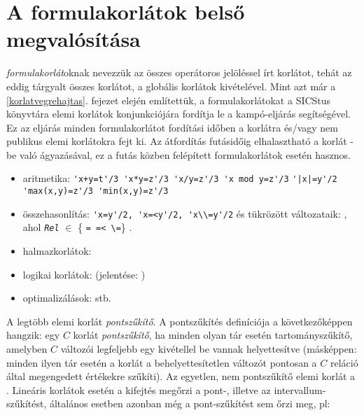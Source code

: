 \section{A formulakorlátok belső megvalósítása}
\label{korlatkif}

 \emph{formulakorlát}oknak nevezzük az összes operátoros
jelöléssel írt korlátot, tehát az eddig tárgyalt összes korlátot, a
globális korlátok kivételével.
\br
Mint azt már a \ref{korlatvegrehajtas}. fejezet elején említettük, a
formulakorlátokat a SICStus \clpfd könyvtára elemi korlátok konjunkciójára
fordítja le a  kampó-eljárás segítségével. Ez az
eljárás minden formulakorlátot fordítási időben a 
korlátra és/vagy nem publikus elemi korlátokra fejt ki. Az átfordítás
futásidőig elhalasztható a korlát -be való ágyazásával, ez
a futás közben felépített formulakorlátok esetén hasznos.

\begin{itemize}
\item aritmetika: \verb?'x+y=t'/3 'x*y=z'/3 'x/y=z'/3 'x mod y=z'/3?
\verb?'|x|=y'/2 'max(x,y)=z'/3 'min(x,y)=z'/3?
 \item összehasonlítás: \verb?'x=y'/2, 'x=<y'/2, 'x\\=y'/2?
és tükrözött változataik: ,
ahol {\tt\em Rel} $\in$ \{ \verb?= =< \=?\} .
\item halmazkorlátok: 
\item logikai korlátok:  (jelentése: )
\item optimalizálások:  stb.
\end{itemize}

\label{pontszukites}
A legtöbb elemi korlát \emph{pontszűkítő}. A pontszűkítés definíciója
a következőképpen hangzik: egy $C$ korlát \emph{pontszűkítő}, ha minden
olyan tár esetén tartományszűkítő, amelyben $C$ változói legfeljebb
egy kivétellel be vannak helyettesítve (másképpen: minden ilyen tár esetén
a korlát a behelyettesítetlen változót pontosan a $C$ reláció által
megengedett értékekre szűkíti). Az egyetlen, nem pontszűkítő elemi
korlát a .
\br
Lineáris korlátok esetén a kifejtés megőrzi a pont-, illetve az
intervallum-szűkítést, általános esetben azonban még a pont-szűkítést
sem őrzi meg, pl:

